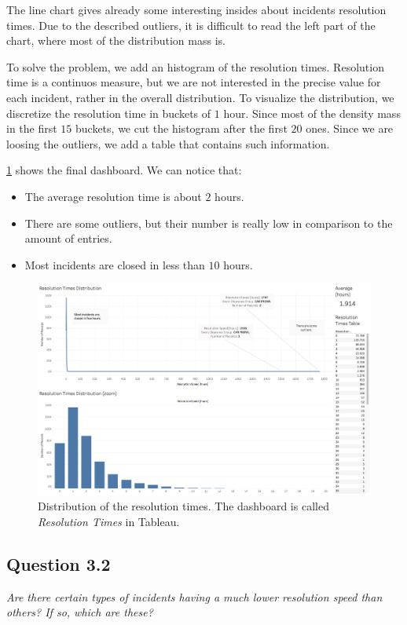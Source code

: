 The line chart gives already some interesting insides about incidents resolution times.
Due to the described outliers, it is difficult to read the left part of the chart, where most of the distribution mass is.

To solve the problem, we add an histogram of the resolution times.
Resolution time is a continuos measure, but we are not interested in the precise value for each incident, rather in the overall distribution.
To visualize the distribution, we discretize the resolution time in buckets of $1$ hour.
Since most of the density mass in the first $15$ buckets, we cut the histogram after the first $20$ ones.
Since we are loosing the outliers, we add a table that contains such information.

\cref{fig:3_1_resolution_speed} shows the final dashboard.
We can notice that:
\begin{itemize}
    \item The average resolution time is about $2$ hours.
    \item There are some outliers, but their number is really low in comparison to the amount of entries.
    \item Most incidents are closed in less than $10$ hours.
\end{itemize}

\begin{figure}[h]
	\centering
	\includegraphics[width=\columnwidth]{figures/3_1_resolution_speed}
	\caption{Distribution of the resolution times. The dashboard is called \textit{Resolution Times} in Tableau.}
	\label{fig:3_1_resolution_speed}
\end{figure}


\subsection*{Question 3.2}
\textit{Are there certain types of incidents having a much lower resolution speed than others? If so, which are these?}

